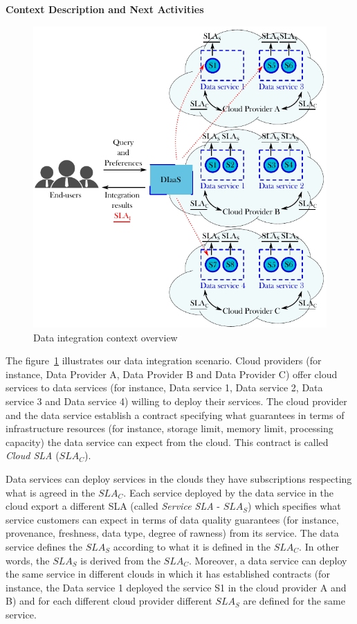 \documentclass[12pt,a4paper,oneside]{report}
\begin{document}
\begin{center}
\textbf{\large{Context Description and Next Activities}}
\end{center}
\bigskip

\begin{figure}[b!]
\center
\includegraphics[scale=1]{figures/scenario.pdf}\caption{Data integration context overview}\label{fig:context}
\end{figure}

The figure~\ref{fig:context} illustrates our data integration scenario. Cloud providers (for instance, Data Provider A, Data Provider B and Data Provider C) offer cloud services to data services (for instance, Data service 1, Data service 2, Data service 3 and Data service 4) willing to deploy their services. The cloud provider and the data service establish a contract specifying what guarantees in terms of infrastructure resources (for instance, storage limit, memory limit, processing capacity) the data service can expect from the cloud. This contract is called \textsl{Cloud SLA} ($SLA_{C}$).

Data services can deploy services in the clouds they have subscriptions respecting what is agreed in the $SLA_{C}$. Each service deployed by the data service in the cloud export a different SLA (called \textsl{Service SLA} - $SLA_{S}$) which specifies what service customers can expect in terms of data quality guarantees (for instance, provenance, freshness, data type, degree of rawness) from its service. The data service defines the $SLA_{S}$ according to what it is defined in the $SLA_{C}$. In other words, the $SLA_{S}$ is derived from the $SLA_{C}$. Moreover, a data service can deploy the same service in different clouds in which it has established contracts (for instance, the Data service 1 deployed the service S1 in the cloud provider A and B) and for each different cloud provider different $SLA_{S}$ are defined for the same service.
\end{document}
